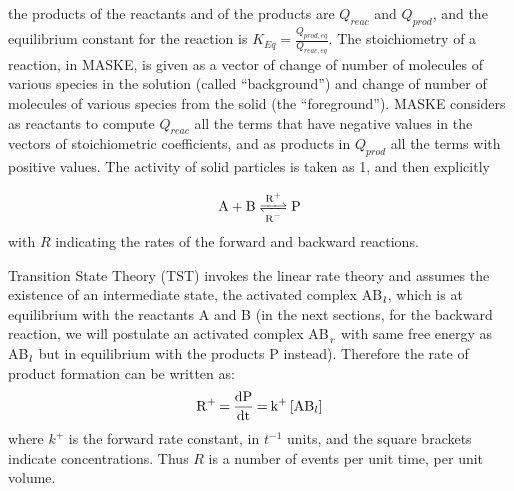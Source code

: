\documentclass[12pt]{paper}    %
\begin{document}
the  products of the reactants and of the products are $Q_{reac}$ and $Q_{prod}$, and the equilibrium constant for the reaction is $K_{Eq} = \frac{Q_{prod,eq}}{Q_{reac,eq}}$. The stoichiometry of a reaction, in MASKE, is given as a vector of change of number of molecules of various species in the solution (called ``background'') and change of number of molecules of various species from the solid (the ``foreground''). MASKE considers as reactants to compute $Q_{reac}$ all the terms that have negative values in the vectors of stoichiometric coefficients, and as products in $Q_{prod}$ all the terms with positive values. The activity of solid particles is taken as 1, and then explicitly 



\vspace{5cm}



\begin{equation}
\ce{A + B <=>[R+][R-]
P}
\end{equation}
%
with $R$ indicating the rates of the forward and backward reactions.

Transition State Theory (TST) invokes the linear rate theory and assumes the existence of an intermediate state, the activated complex AB$\ce{_l}$, which is at equilibrium with the reactants A and B (in the next sections, for the backward reaction, we will postulate an activated complex AB$\ce{_r}$ with same free energy as AB$\ce{_l}$ but in equilibrium with the products P instead). Therefore the rate of product formation can be written as:
%
\begin{equation}
\ce{R+ = \frac{dP}{dt} = k+ [AB_l]}
\end{equation}
%
where $k^+$ is the forward rate constant, in $t^{-1}$ units, and the square brackets indicate concentrations. Thus $R$ is a number of events per unit time, per unit volume.
\end{document}
